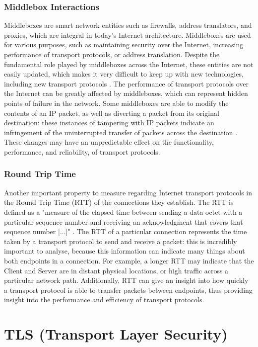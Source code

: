 \documentclass{l4proj}
\begin{document}
\subsubsection{Middlebox Interactions} Middleboxes are smart network entities such as firewalls, address translators, and proxies, which are integral in today's Internet architecture. Middleboxes are used for various purposes, such as maintaining security over the Internet, increasing performance of transport protocols, or address translation. Despite the fundamental role played by middleboxes across the Internet, these entities are not easily updated, which makes it very difficult to keep up with new technologies, including new transport protocols \citep{Allman2003}.
The performance of transport protocols over the Internet can be greatly affected by middleboxes, which can represent hidden points of failure in the network. Some middleboxes are able to modify the contents of an IP packet, as well as diverting a packet from its original destination: these instances of tampering with IP packets indicate an infringement of the uninterrupted transfer of packets across the destination \citep{Medi2005}. These changes may have an unpredictable effect on the functionality, performance, and reliability, of transport protocols.

\subsubsection{Round Trip Time} Another important property to measure regarding Internet transport protocols in the Round Trip Time (RTT) of the connections they establish. The RTT is defined as a "measure of the elapsed time between sending a data octet with a particular sequence number and receiving an acknowledgment that covers that sequence number [...]" \citep{Postel1981}. The RTT of a particular connection represents the time taken by a transport protocol to send and receive a packet: this is incredibly important to analyse, because this information can indicate many things about both endpoints in a connection. For example, a longer RTT may indicate that the Client and Server are in distant physical locations, or high traffic across a particular network path. Additionally, RTT can give an insight into how quickly a transport protocol is able to transfer packets between endpoints, thus providing insight into the performance and efficiency of transport protocols.


\section{TLS (Transport Layer Security)}
\end{document}

